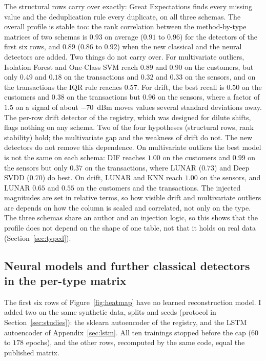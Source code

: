 \documentclass[conference]{IEEEtran}
\begin{document}
The structural rows carry over exactly: Great Expectations finds every missing
value and the deduplication rule every duplicate, on all three schemas. The
overall profile is stable too: the rank correlation between the method-by-type
matrices of two schemas is $0.93$ on average ($0.91$ to $0.96$) for the detectors
of the first six rows, and $0.89$ ($0.86$ to $0.92$) when the new classical and
the neural detectors are added. Two things do
not carry over. For multivariate outliers, Isolation Forest and One-Class SVM
reach $0.89$ and $0.90$ on the customers, but only $0.49$ and $0.18$ on the
transactions and $0.32$ and $0.33$ on the sensors, and on the transactions the
IQR rule reaches $0.57$. For drift, the best recall is $0.50$ on the customers
and $0.38$ on the transactions but $0.96$ on the sensors, where a factor of
$1.5$ on a signal of about $-70$~dBm moves values several standard deviations
away. The per-row drift detector of the registry, which was designed for
dilute shifts, flags nothing on any schema. Two of the four hypotheses
(structural rows, rank stability) hold; the multivariate gap and the weakness of
drift do not. The new detectors do not remove this dependence. On multivariate outliers the best model
is not the same on each schema: DIF reaches $1.00$ on the customers and $0.99$ on the sensors
but only $0.37$ on the transactions, where LUNAR ($0.73$) and Deep SVDD ($0.70$) do best. On
drift, LUNAR and KNN reach $1.00$ on the sensors, and LUNAR $0.65$ and $0.55$ on the customers
and the transactions. The injected magnitudes are set in relative terms, so how visible
drift and multivariate outliers are depends on how the column is scaled
and correlated, not only on the type. The three schemas share an author and an
injection logic, so this shows that the profile does not depend on the shape of
one table, not that it holds on real data (Section~\ref{sec:typed}).

\subsection{Neural models and further classical detectors in the per-type matrix}
\label{sec:deep-rows}
The first six rows of Figure~\ref{fig:heatmap} have no learned reconstruction model. I
added two on the same synthetic data, splits and seeds (protocol in
Section~\ref{sec:studies}): the sklearn autoencoder of the registry, and the LSTM
autoencoder of Appendix~\ref{sec:lstm}. All ten trainings stopped before the cap ($60$ to $178$
epochs), and the other rows, recomputed by the same code, equal the published matrix.
\end{document}
